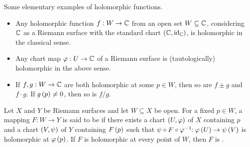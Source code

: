 \documentclass[../Moduli_Spaces_of_Riemann_Surfaces.tex]{subfiles}
\begin{document}
    \begin{example}\label{1.2:exa:elementary_holomorphic_functions}
        Some elementary examples of holomorphic functions.
        \begin{itemize}
            \item Any holomorphic function $f:W\to\mathbb{C}$ from an open set $W\subseteq\mathbb{C}$, considering $\mathbb{C}$ as a Riemann surface with the standard chart $\left(\mathbb{C},\operatorname{id}_{\mathbb{C}}\right)$, is holomorphic in the classical sense.
            \item Any chart map $\varphi:U\to\mathbb{C}$ of a Riemann surface is (tautologically) holomorphic in the above sense.
            \item If $f,g:W\to\mathbb{C}$ are both holomorphic at some $p\in W$, then so are $f\pm g$ and $f\cdot g$. If $g\left(p\right)\neq0$, then so is $f/g$.\exqed
        \end{itemize}
    \end{example}
    \begin{definition}
        Let $X$ and $Y$ be Riemann surfaces and let $W\subseteq X$ be open. For a fixed $p\in W$, a mapping $F:W\to Y$ is said to be  if there exists a chart $\left(U,\varphi\right)$ of $X$ containing $p$ and a chart $\left(V,\psi\right)$ of $Y$ containing $F\left(p\right)$ such that $\psi\circ F\circ\varphi^{-1}\!\!:\varphi\left(U\right)\to\psi\left(V\right)$ is holomorphic at $\varphi\left(p\right)$. If $F$ is holomorphic at every point of $W$, then $F$ is .
    \end{definition}
\end{document}
